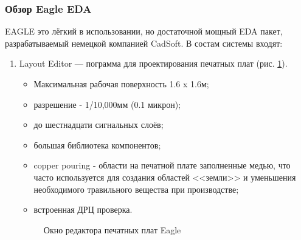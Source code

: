 \subsubsection{Обзор Eagle EDA}
\begin{par}
EAGLE это лёгкий в использовании, но достаточной мощный EDA пакет, разрабатываемый немецкой компанией CadSoft.
В состам системы входят:
\begin{enumerate}
	\item{}Layout Editor --- пограмма для проектирования печатных плат (рис. \ref{img:eagle_brd}). 
		\begin{itemize}
			\item{}Максимальная рабочая поверхность 1.6 x 1.6м;
			\item{}разрешение - 1/10,000мм (0.1 микрон);
			\item{}до шестнадцати сигнальных слоёв;
			\item{}большая библиотека компонентов;
			\item{}copper pouring - области на печатной плате заполненные  медью, что часто используется для создания областей <<земли>> и уменьшения необходимого травильного вещества при производстве;
			\item{}встроенная ДРЦ проверка.
		\end{itemize}
        \begin{figure}[h]
            \caption{Окно редактора печатных плат Eagle}
            \label{img:eagle_brd}
        \end{figure}


\end{enumerate}
\end{par}
